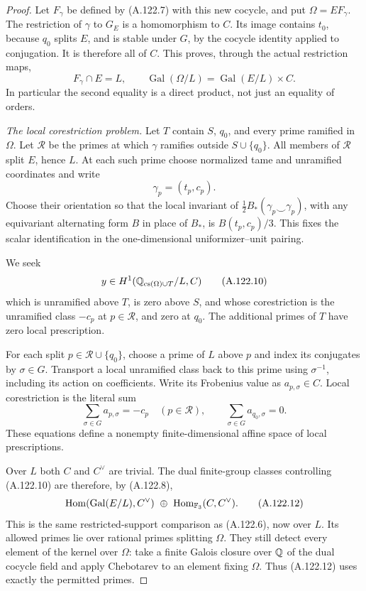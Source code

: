 \begin{proof}
Let \(F_\gamma\) be defined by (A.122.7) with this
new cocycle, and put \(\Omega=E F_\gamma\).
The restriction of \(\gamma\) to \(G_E\) is a
homomorphism to \(C\).
Its image contains \(t_0\), because \(q_0\) splits
\(E\), and is stable under \(G\), by the cocycle
identity applied to conjugation.
It is therefore all of \(C\).
This proves, through the actual restriction maps,
\[
 F_\gamma\cap E=L,\qquad
 \operatorname{Gal}(\Omega/L)
       =\operatorname{Gal}(E/L)\times C.
 \tag{A.122.8}
\]
In particular the second equality is a direct
product, not just an equality of orders.

\emph{The local corestriction problem.}
Let \(T\) contain \(S\), \(q_0\), and every prime
ramified in \(\Omega\).
Let \(\mathcal R\) be the primes at which \(\gamma\)
ramifies outside \(S\cup\{q_0\}\).
All members of \(\mathcal R\) split \(E\), hence \(L\).
At each such prime choose normalized tame and
unramified coordinates and write
\[
                    \gamma_p=(t_p,c_p).
 \tag{A.122.9}
\]
Choose their orientation so that the local invariant
of \(\tfrac12 B_*(\gamma_p\smile\gamma_p)\), with any
equivariant alternating form \(B\) in place of \(B_*\),
is \(B(t_p,c_p)/3\).
This fixes the scalar identification in the
one-dimensional uniformizer--unit pairing.

We seek
\[
 y\in H^1(\mathbb Q_{{\rm cs}(\Omega)\cup T}/L,C)
 \tag{A.122.10}
\]
which is unramified above \(T\), is zero above \(S\),
and whose corestriction is the unramified class
\(-c_p\) at \(p\in\mathcal R\), and zero at \(q_0\).
The additional primes of \(T\) have zero local
prescription.

For each split \(p\in\mathcal R\cup\{q_0\}\),
choose a prime of \(L\) above \(p\) and index
its conjugates by \(\sigma\in G\).
Transport a local unramified class back to this
prime using \(\sigma^{-1}\), including its action
on coefficients.  Write its Frobenius value
as \(a_{p,\sigma}\in C\).
Local corestriction is the literal sum
\[
 \sum_{\sigma\in G}a_{p,\sigma}=-c_p
                    \quad(p\in\mathcal R),\qquad
 \sum_{\sigma\in G}a_{q_0,\sigma}=0 .
 \tag{A.122.11}
\]
These equations define a nonempty finite-dimensional
affine space of local prescriptions.

Over \(L\) both \(C\) and \(C^\vee\) are trivial.
The dual finite-group classes controlling
(A.122.10) are therefore, by (A.122.8),
\[
 \operatorname{Hom}(\operatorname{Gal}(E/L),C^\vee)
                  \ \oplus\ \operatorname{Hom}_{\mathbb F_3}(C,C^\vee).
 \tag{A.122.12}
\]
This is the same restricted-support comparison as
(A.122.6), now over \(L\).
Its allowed primes lie over rational primes
splitting \(\Omega\).
They still detect every element of the kernel
over \(\Omega\): take a finite Galois closure
over \(\mathbb Q\) of the dual cocycle field and apply
Chebotarev to an element fixing \(\Omega\).
Thus (A.122.12) uses exactly the permitted primes.


\end{proof}
